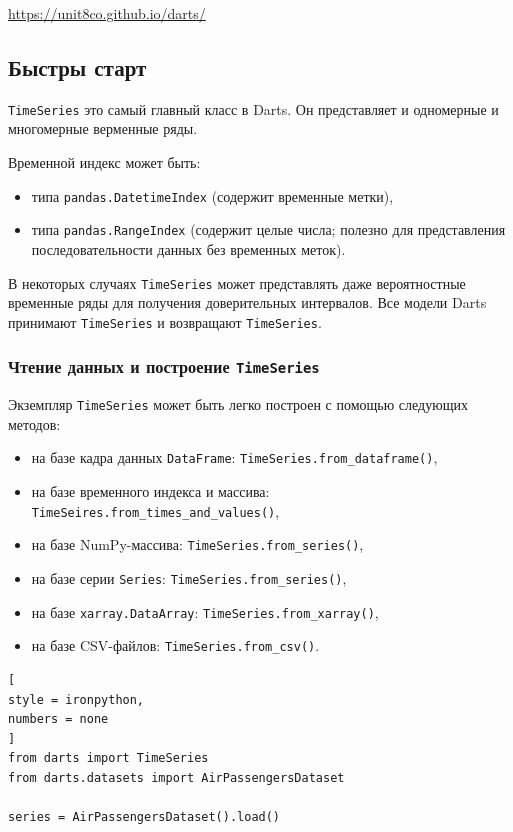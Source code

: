 \documentclass[%
	11pt,
	a4paper,
	utf8,
		]{article}
\begin{document}
\url{https://unit8co.github.io/darts/}

\subsection{Быстры старт}

\verb|TimeSeries| это самый главный класс в Darts. Он представляет и одномерные и многомерные верменные ряды.

Временной индекс может быть:
\begin{itemize}
	\item типа \verb|pandas.DatetimeIndex| (содержит временные метки),
	
	\item типа \verb|pandas.RangeIndex| (содержит целые числа; полезно для представления последовательности данных без временных меток).
\end{itemize}

В некоторых случаях \verb|TimeSeries| может представлять даже вероятностные временные ряды для получения доверительных интервалов. Все модели Darts принимают \verb|TimeSeries| и возвращают \verb|TimeSeries|.

\subsubsection{Чтение данных и построение \texttt{TimeSeries}}

Экземпляр \verb|TimeSeries| может быть легко построен с помощью следующих методов:
\begin{itemize}
	\item на базе кадра данных \verb|DataFrame|: \verb|TimeSeries.from_dataframe()|,
	
	\item на базе временного индекса и массива: \verb|TimeSeires.from_times_and_values()|,
	
	\item на базе NumPy-массива: \verb|TimeSeries.from_series()|,
	
	\item на базе серии \verb|Series|: \verb|TimeSeries.from_series()|,
	
	\item на базе \verb|xarray.DataArray|: \verb|TimeSeries.from_xarray()|,
	
	\item на базе CSV-файлов: \verb|TimeSeries.from_csv()|.
\end{itemize}

\begin{lstlisting}[
style = ironpython,
numbers = none
]
from darts import TimeSeries
from darts.datasets import AirPassengersDataset

series = AirPassengersDataset().load()
\end{lstlisting}
\end{document}
